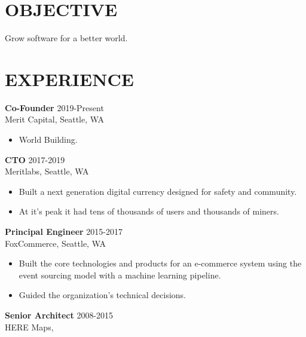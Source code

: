 \documentclass[line,margin]{res}
\begin{document}
\address{{\bf www.mempko.com}}
\address{{\bf max@mempko.com}}

\begin{resume}
 
\section{OBJECTIVE}       
                Grow software for a better world.
 
\section{EXPERIENCE} 
                {\bf Co-Founder} \hfill 2019-Present \\
                Merit Capital, 
                Seattle, WA
                 \begin{itemize}  \itemsep -2pt %
                    \item World Building.
                 \end{itemize}
                {\bf CTO} \hfill 2017-2019 \\
                Meritlabs, 
                Seattle, WA
                 \begin{itemize}  \itemsep -2pt %
                    \item Built a next generation digital currency designed
                        for safety and community.
                    \item At it's peak it had tens of thousands of users and thousands of miners.
                 \end{itemize}
                {\bf Principal Engineer} \hfill 2015-2017 \\
                FoxCommerce, 
                Seattle, WA
                 \begin{itemize}  \itemsep -2pt %
                    \item Built the core technologies and products for an e-commerce system 
                        using the event sourcing model with a machine learning pipeline.
                    \item Guided the organization's technical decisions.
                 \end{itemize}
                {\bf Senior Architect} \hfill 2008-2015 \\
                HERE Maps, 

\end{resume}
\end{document}
